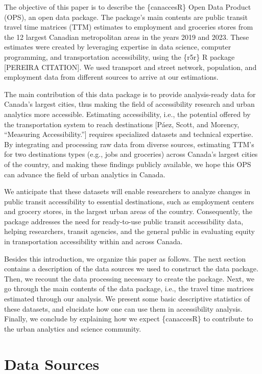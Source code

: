 \documentclass[Royal,times,sageh]{sagej}
\begin{document}
The objective of this paper is to describe the \{canaccesR\} Open Data
Product (OPS), an open data package. The package's main contents are
public transit travel time matrices (TTM) estimates to employment and
groceries stores from the 12 largest Canadian metropolitan areas in the
years 2019 and 2023. These estimates were created by leveraging
expertise in data science, computer programming, and transportation
accessibility, using the \{r5r\} R package {[}PEREIRA CITATION{]}. We
used transport and street network, population, and employment data from
different sources to arrive at our estimations.

The main contribution of this data package is to provide analysis-ready
data for Canada's largest cities, thus making the field of accessibility
research and urban analytics more accessible. Estimating accessibility,
i.e., the potential offered by the transportation system to reach
destinations {[}Páez, Scott, and Morency, ``Measuring
Accessibility.''{]} requires specialized datasets and technical
expertise. By integrating and processing raw data from diverse sources,
estimating TTM's for two destinations types (e.g., jobs and groceries)
across Canada's largest cities of the country, and making these findings
publicly available, we hope this OPS can advance the field of urban
analytics in Canada.

We anticipate that these datasets will enable researchers to analyze
changes in public transit accessibility to essential destinations, such
as employment centers and grocery stores, in the largest urban areas of
the country. Consequently, the package addresses the need for
ready-to-use public transit accessibility data, helping researchers,
transit agencies, and the general public in evaluating equity in
transportation accessibility within and across Canada.

Besides this introduction, we organize this paper as follows. The next
section contains a description of the data sources we used to construct
the data package. Then, we recount the data processing necessary to
create the package. Next, we go through the main contents of the data
package, i.e., the travel time matrices estimated through our analysis.
We present some basic descriptive statistics of these datasets, and
elucidate how one can use them in accessibility analysis. Finally, we
conclude by explaining how we expect \{canaccesR\} to contribute to the
urban analytics and science community.

\section{Data Sources}\label{data-sources}
\end{document}
